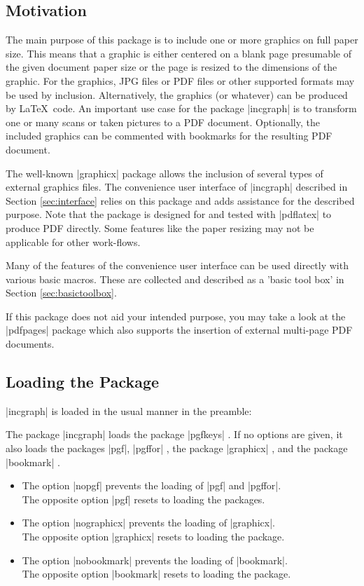 \documentclass[a4paper,11pt]{ltxdoc}
\begin{document}
\subsection{Motivation}
The main purpose of this package is to include one or more graphics on full
paper size. This means that a graphic is either centered on a blank page
presumable of the given document paper size or the page is resized
to the dimensions of the graphic.
For the graphics, JPG files or PDF files or other supported formats may be
used by inclusion. Alternatively, the graphics (or whatever) can be produced
by \LaTeX\ code.
An important use case for the package |incgraph| is to transform one or many scans
or taken pictures to a PDF document. Optionally, the included graphics can
be commented with bookmarks for the resulting PDF document.

The well-known |graphicx| package \cite{carlisle:1999a} allows the inclusion
of several types of external graphics files. The convenience user interface
of |incgraph| described in Section \ref{sec:interface} relies on this package and adds
assistance for the described purpose. Note that the package is designed for and
tested with |pdflatex| to produce PDF directly. Some features like the paper
resizing may not be applicable for other work-flows.

Many of the features of the convenience user interface can be used directly
with various basic macros. These are collected and described
as a 'basic tool box' in Section \ref{sec:basictoolbox}.

If this package does not aid your intended purpose, you may take a look
at the |pdfpages| package \cite{matthias:2012a} which also supports the insertion of
external multi-page PDF documents.


\subsection{Loading the Package}
|incgraph| is loaded in the usual manner in the preamble:
\begin{dispListing}
\usepackage{incgraph}
\end{dispListing}

The package |incgraph| loads the package
|pgfkeys| \cite{tantau:2013a}. If no options are given, it also
loads the packages |pgf|, |pgffor| \cite{tantau:2013a},
the package |graphicx| \cite{carlisle:1999a}, and the
package |bookmark| \cite{oberdiek:2011a}.

\begin{itemize}
\item The option |nopgf| prevents the loading of |pgf| and |pgffor|.\\
  The opposite option |pgf| resets to loading the packages.
\item The option |nographicx| prevents the loading of |graphicx|.\\
  The opposite option |graphicx| resets to loading the package.
\item The option |nobookmark| prevents the loading of |bookmark|.\\
  The opposite option |bookmark| resets to loading the package.
\end{itemize}
\end{document}
